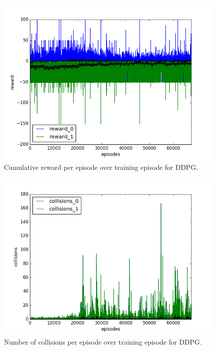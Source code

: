 \begin{figure}[h]
  \centering
  \includegraphics[trim=10 10 10 10,clip,width=\figscale\linewidth]
  {../results/ddpg_1vs1/reward.png}
  \caption{Cumulative reward per episode over training episode for DDPG.}
  \label{fig:ddpg-1vs1}
\end{figure}
\FloatBarrier


\begin{figure}[h]
  \centering
  \includegraphics[trim=10 10 10 10,clip,width=\figscale\linewidth]
  {../results/ddpg_1vs1/collisions.png}
  \caption{Number of collisions per episode over training episode for DDPG.}
  \label{fig:ddpg-1vs1}
\end{figure}
\FloatBarrier


